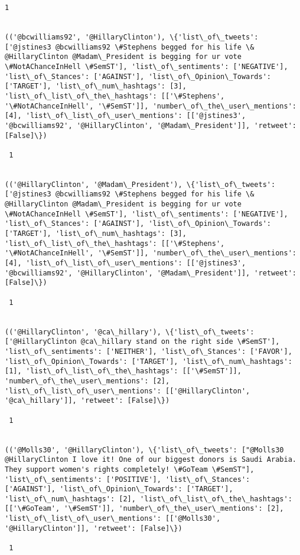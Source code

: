 \documentclass[11pt]{article}
\begin{document}
\begin{Verbatim}[commandchars=\\\{\}]
 1
 

(('@bcwilliams92', '@HillaryClinton'), \{'list\_of\_tweets': ['@jstines3 @bcwilliams92 \#Stephens begged for his life \& @HillaryClinton @Madam\_President is begging for ur vote \#NotAChanceInHell \#SemST'], 'list\_of\_sentiments': ['NEGATIVE'], 'list\_of\_Stances': ['AGAINST'], 'list\_of\_Opinion\_Towards': ['TARGET'], 'list\_of\_num\_hashtags': [3], 'list\_of\_list\_of\_the\_hashtags': [['\#Stephens', '\#NotAChanceInHell', '\#SemST']], 'number\_of\_the\_user\_mentions': [4], 'list\_of\_list\_of\_user\_mentions': [['@jstines3', '@bcwilliams92', '@HillaryClinton', '@Madam\_President']], 'retweet': [False]\})

 1
 

(('@HillaryClinton', '@Madam\_President'), \{'list\_of\_tweets': ['@jstines3 @bcwilliams92 \#Stephens begged for his life \& @HillaryClinton @Madam\_President is begging for ur vote \#NotAChanceInHell \#SemST'], 'list\_of\_sentiments': ['NEGATIVE'], 'list\_of\_Stances': ['AGAINST'], 'list\_of\_Opinion\_Towards': ['TARGET'], 'list\_of\_num\_hashtags': [3], 'list\_of\_list\_of\_the\_hashtags': [['\#Stephens', '\#NotAChanceInHell', '\#SemST']], 'number\_of\_the\_user\_mentions': [4], 'list\_of\_list\_of\_user\_mentions': [['@jstines3', '@bcwilliams92', '@HillaryClinton', '@Madam\_President']], 'retweet': [False]\})

 1
 

(('@HillaryClinton', '@ca\_hillary'), \{'list\_of\_tweets': ['@HillaryClinton @ca\_hillary stand on the right side \#SemST'], 'list\_of\_sentiments': ['NEITHER'], 'list\_of\_Stances': ['FAVOR'], 'list\_of\_Opinion\_Towards': ['TARGET'], 'list\_of\_num\_hashtags': [1], 'list\_of\_list\_of\_the\_hashtags': [['\#SemST']], 'number\_of\_the\_user\_mentions': [2], 'list\_of\_list\_of\_user\_mentions': [['@HillaryClinton', '@ca\_hillary']], 'retweet': [False]\})

 1
 

(('@Molls30', '@HillaryClinton'), \{'list\_of\_tweets': ["@Molls30 @HillaryClinton I love it! One of our biggest donors is Saudi Arabia. They support women's rights completely! \#GoTeam \#SemST"], 'list\_of\_sentiments': ['POSITIVE'], 'list\_of\_Stances': ['AGAINST'], 'list\_of\_Opinion\_Towards': ['TARGET'], 'list\_of\_num\_hashtags': [2], 'list\_of\_list\_of\_the\_hashtags': [['\#GoTeam', '\#SemST']], 'number\_of\_the\_user\_mentions': [2], 'list\_of\_list\_of\_user\_mentions': [['@Molls30', '@HillaryClinton']], 'retweet': [False]\})

 1
 


\end{Verbatim}
\end{document}
